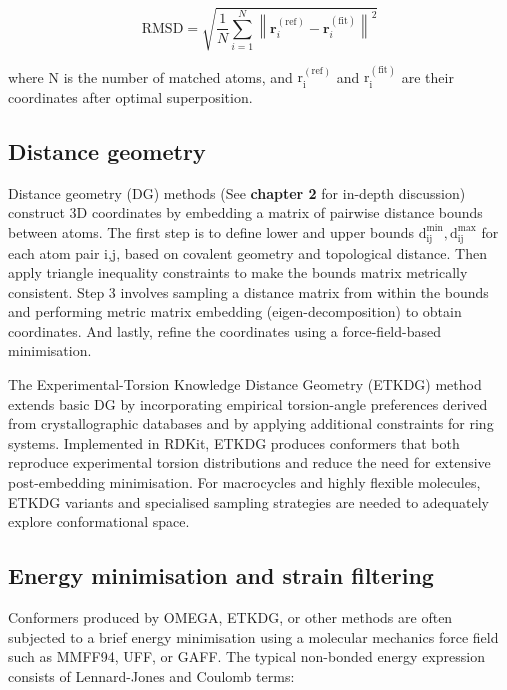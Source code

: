 \documentclass[12pt]{article}
\begin{document}
\begin{equation}
\mathrm{RMSD} = \sqrt{\frac{1}{N} \sum_{i=1}^{N} \left\lVert \mathbf{r}_i^{(\mathrm{ref})} - \mathbf{r}_i^{(\mathrm{fit})} \right\rVert^2}
\label{eq:ligRMSD}
\end{equation}

where N is the number of matched atoms, and $\textrm{r}_\textrm{i}^{(\textrm{ref})}$ and $\textrm{r}_\textrm{i}^{(\textrm{fit})}$ are their coordinates after optimal superposition. 

\subsection{Distance geometry}

Distance geometry (DG) methods\cite{CH6_spellmeyer1997DG} (See \textbf{chapter 2} for in-depth discussion) construct 3D coordinates by embedding a matrix of pairwise distance bounds between atoms. The first step is to define lower and upper bounds $\textrm{d}_\textrm{ij}^{\textrm{min}}, \textrm{d}_\textrm{ij}^{\textrm{max}}$ for each atom pair i,j, based on covalent geometry and topological distance. Then apply triangle inequality constraints to make the bounds matrix metrically consistent. Step 3 involves sampling a distance matrix from within the bounds and performing metric matrix embedding (eigen-decomposition) to obtain coordinates. And lastly, refine the coordinates using a force-field-based minimisation.

The Experimental-Torsion Knowledge Distance Geometry (ETKDG) method \cite{CH6_Riniker2015} extends basic DG by incorporating empirical torsion-angle preferences derived from crystallographic databases and by applying additional constraints for ring systems. Implemented in RDKit, ETKDG\cite{CH6_Riniker2015} produces conformers that both reproduce experimental torsion distributions and reduce the need for extensive post-embedding minimisation. For macrocycles and highly flexible molecules, ETKDG variants\cite{CH6_wang2020improving} and specialised sampling strategies are needed to adequately explore conformational space.

\subsection{Energy minimisation and strain filtering}

Conformers produced by OMEGA, ETKDG, or other methods are often subjected to a brief energy minimisation using a molecular mechanics force field such as MMFF94\cite{CH6_halgren1996merck}, UFF\cite{CH6_rappe1992uff}, or GAFF\cite{CH6_gaff,CH6_sprenger2015general}. The typical non-bonded energy expression consists of Lennard-Jones and Coulomb terms:
\end{document}
